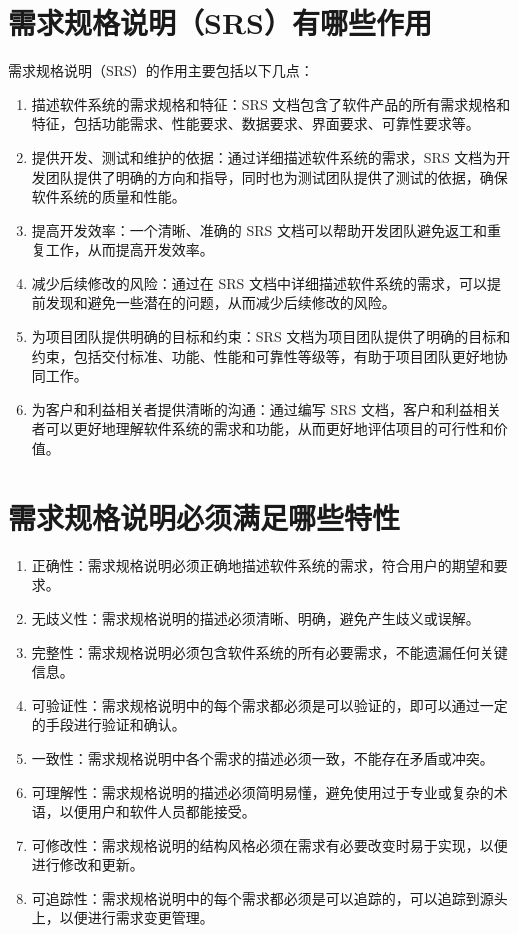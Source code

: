\documentclass[11pt, a4paper, oneside]{ctexbook}
\begin{document}
\section{需求规格说明（SRS）有哪些作用}
需求规格说明（SRS）的作用主要包括以下几点：
\begin{enumerate}
    \item 描述软件系统的需求规格和特征：SRS 文档包含了软件产品的所有需求规格和特征，包括功能需求、性能要求、数据要求、界面要求、可靠性要求等。
    \item 提供开发、测试和维护的依据：通过详细描述软件系统的需求，SRS 文档为开发团队提供了明确的方向和指导，同时也为测试团队提供了测试的依据，确保软件系统的质量和性能。
    \item 提高开发效率：一个清晰、准确的 SRS 文档可以帮助开发团队避免返工和重复工作，从而提高开发效率。
    \item 减少后续修改的风险：通过在 SRS 文档中详细描述软件系统的需求，可以提前发现和避免一些潜在的问题，从而减少后续修改的风险。
    \item 为项目团队提供明确的目标和约束：SRS 文档为项目团队提供了明确的目标和约束，包括交付标准、功能、性能和可靠性等级等，有助于项目团队更好地协同工作。
    \item 为客户和利益相关者提供清晰的沟通：通过编写 SRS 文档，客户和利益相关者可以更好地理解软件系统的需求和功能，从而更好地评估项目的可行性和价值。
\end{enumerate}
\section{需求规格说明必须满足哪些特性}
\begin{enumerate}
    \item 正确性：需求规格说明必须正确地描述软件系统的需求，符合用户的期望和要求。
    \item 无歧义性：需求规格说明的描述必须清晰、明确，避免产生歧义或误解。
    \item 完整性：需求规格说明必须包含软件系统的所有必要需求，不能遗漏任何关键信息。
    \item 可验证性：需求规格说明中的每个需求都必须是可以验证的，即可以通过一定的手段进行验证和确认。
    \item 一致性：需求规格说明中各个需求的描述必须一致，不能存在矛盾或冲突。
    \item 可理解性：需求规格说明的描述必须简明易懂，避免使用过于专业或复杂的术语，以便用户和软件人员都能接受。
    \item 可修改性：需求规格说明的结构风格必须在需求有必要改变时易于实现，以便进行修改和更新。
    \item 可追踪性：需求规格说明中的每个需求都必须是可以追踪的，可以追踪到源头上，以便进行需求变更管理。
\end{enumerate}
\end{document}

